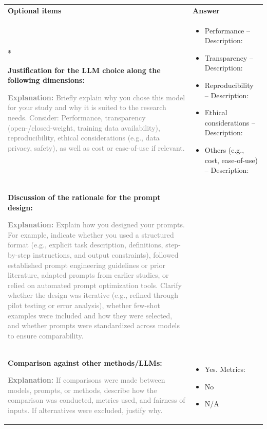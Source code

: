 \documentclass[12pt]{article}
\newcommand{\unchecked}{\ding{111}} %
\begin{document}
\begin{longtable}{|p{}|p{}|}
\hline
\rowcolor{yellow!30}
\textbf{Optional items} & \textbf{Answer} \\*   %
\hline

\textbf{Justification for the LLM choice along the following dimensions:}

\textcolor{gray}{\footnotesize
\textbf{Explanation:} Briefly explain why you chose this model for your study and why it is suited to the research needs. Consider:
Performance, transparency (open-/closed-weight, training data availability), reproducibility, ethical considerations (e.g., data privacy, safety), as well as cost or ease-of-use if relevant.
}
&
\begin{itemize}[leftmargin=*]\setlength{\itemsep}{0pt}\setlength{\parskip}{0pt}
    \item[\unchecked] Performance – Description:
    \item[\unchecked] Transparency – Description:
    \item[\unchecked] Reproducibility – Description:
    \item[\unchecked] Ethical considerations – Description:
    \item[\unchecked] Others (e.g., cost, ease-of-use) – Description:
\end{itemize}
\\
\hline

\textbf{Discussion of the rationale for the prompt design:}

\textcolor{gray}{\footnotesize
\textbf{Explanation:} Explain how you designed your prompts. For example, indicate whether you used a structured format (e.g., explicit task description, definitions, step-by-step instructions, and output constraints), followed established prompt engineering guidelines or prior literature, adapted prompts from earlier studies, or relied on automated prompt optimization tools. Clarify whether the design was iterative (e.g., refined through pilot testing or error analysis), whether few-shot examples were included and how they were selected, and whether prompts were standardized across models to ensure comparability.
}
&

\\
\hline

\textbf{Comparison against other methods/LLMs:}

\textcolor{gray}{\footnotesize
\textbf{Explanation:} If comparisons were made between models, prompts, or methods, describe how the comparison was conducted, metrics used, and fairness of inputs. If alternatives were excluded, justify why.
}
&
\begin{itemize}[leftmargin=*]\setlength{\itemsep}{0pt}
    \item[\unchecked] Yes. Metrics:
    \item[\unchecked] No
    \item[\unchecked] N/A
\end{itemize}
\\
\hline


\end{longtable}
\end{document}
